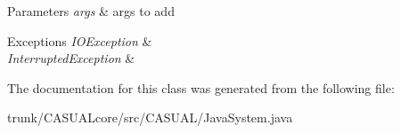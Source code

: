 \begin{DoxyParams}{Parameters}
{\em args} & args to add \\
\hline
\end{DoxyParams}

\begin{DoxyExceptions}{Exceptions}
{\em I\-O\-Exception} & \\
\hline
{\em Interrupted\-Exception} & \\
\hline
\end{DoxyExceptions}


The documentation for this class was generated from the following file\-:\begin{DoxyCompactItemize}
\item 
trunk/\-C\-A\-S\-U\-A\-Lcore/src/\-C\-A\-S\-U\-A\-L/Java\-System.\-java\end{DoxyCompactItemize}
